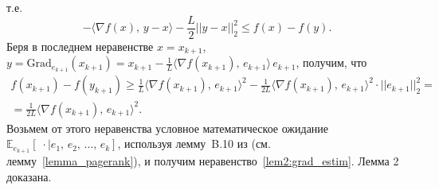 \documentclass[11pt]{article}
\newcommand{\E}{\mathbb{E}}
\begin{document}
		т.е.
		$$
		-\langle\nabla f(x), \, y-x\rangle - \frac{L}{2}||y-x||_2^2 \leqslant f(x) - f(y).
		$$
		Беря в последнем неравенстве $x = x_{k+1}$, $y=\text{Grad}_{e_{k+1}}(x_{k+1}) = x_{k+1} - \frac{1}{L} \langle \nabla f(x_{k+1}), \, e_{k+1}\rangle \, e_{k+1}$, получим, что
		\begin{equation*}
			\begin{array}{rl}
				f(x_{k+1}) - f(y_{k+1}) \geqslant \frac{1}{L} \langle \nabla f(x_{k+1}), \, e_{k+1}\rangle^2 - \frac{1}{2L}\langle \nabla f(x_{k+1}), \, e_{k+1}\rangle^2\cdot||e_{k+1}||_2^2=\\
				= \frac{1}{2L}\langle \nabla f(x_{k+1}), \, e_{k+1}\rangle^2.
			\end{array}
		\end{equation*}
		Возьмем от этого неравенства условное математическое ожидание $\E_{e_{k+1}}[\;\cdot\mid e_1, \, e_2, \, \ldots, \, e_k]$, используя лемму~B.10 из \cite{pagerank} (см. лемму~\ref{lemma_pagerank}), и получим неравенство~\eqref{lem2:grad_estim}. Лемма 2 доказана.
		
\end{document}
